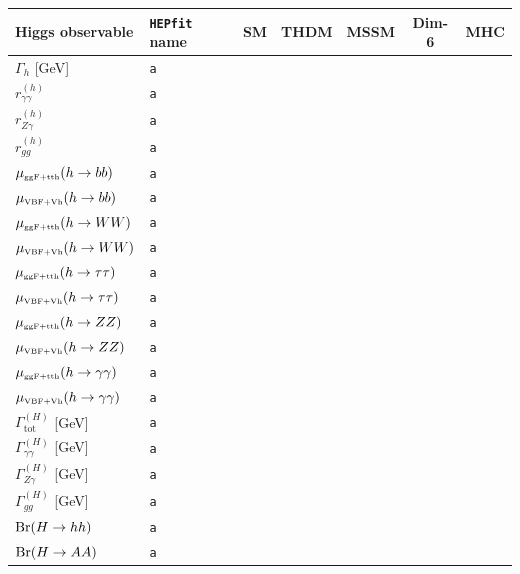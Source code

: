 \documentclass[aps,superscriptaddress,nofootinbib,floatfix,notitlepage]{revtex4-1}
\newcommand{\HEPfit}{\texttt{HEPfit}\xspace}
\begin{document}
\begin{table}
  \centering
  \begin{tabular}{|l|l|c|c|c|c|c|}
    \hline
    \textbf{Higgs observable} & \textbf{\HEPfit name} & \textbf{SM} & \textbf{THDM} & \textbf{MSSM} & \textbf{Dim-6} & \textbf{MHC} \\
    \hline
	$\Gamma_h$ [GeV] & \tt{a} & & \checkmark & & &\\
    \hline
	$r^{(h)}_{\gamma\gamma}$ & \tt{a} & & \checkmark & & &\\
    \hline
	$r^{(h)}_{Z\gamma}$ & \tt{a} & & \checkmark & & &\\
    \hline
	$r^{(h)}_{gg}$ & \tt{a} & & \checkmark & & &\\
    \hline
	$\mu_{\text{\tiny{ggF+tth}}}(h\to bb)$ & \tt{a} & & \checkmark & & &\\
    \hline
	$\mu_{\text{\tiny{VBF+Vh}}}(h\to bb)$ & \tt{a} & & \checkmark & & &\\
    \hline
	$\mu_{\text{\tiny{ggF+tth}}}(h\to WW)$ & \tt{a} & & \checkmark & & &\\
    \hline
	$\mu_{\text{\tiny{VBF+Vh}}}(h\to WW)$ & \tt{a} & & \checkmark & & &\\
    \hline
	$\mu_{\text{\tiny{ggF+tth}}}(h\to \tau \tau)$ & \tt{a} & & \checkmark & & &\\
    \hline
	$\mu_{\text{\tiny{VBF+Vh}}}(h\to \tau \tau)$ & \tt{a} & & \checkmark & & &\\
    \hline
	$\mu_{\text{\tiny{ggF+tth}}}(h\to ZZ)$ & \tt{a} & & \checkmark & & &\\
    \hline
	$\mu_{\text{\tiny{VBF+Vh}}}(h\to ZZ)$ & \tt{a} & & \checkmark & & &\\
    \hline
	$\mu_{\text{\tiny{ggF+tth}}}(h\to \gamma\gamma)$ & \tt{a} & & \checkmark & & &\\
    \hline
	$\mu_{\text{\tiny{VBF+Vh}}}(h\to \gamma\gamma)$ & \tt{a} & & \checkmark & & &\\
    \hline
	$\Gamma^{(H)}_{\text{tot}}$ [GeV] & \tt{a} & & \checkmark & & &\\
    \hline
	$\Gamma^{(H)}_{\gamma\gamma}$ [GeV] & \tt{a} & & \checkmark & & &\\
    \hline
	$\Gamma^{(H)}_{Z\gamma}$ [GeV] & \tt{a} & & \checkmark & & &\\
    \hline
	$\Gamma^{(H)}_{gg}$ [GeV] & \tt{a} & & \checkmark & & &\\
    \hline
	${\rm Br}(H\to hh)$ & \tt{a} & & \checkmark & & &\\
    \hline
	${\rm Br}(H\to AA)$ & \tt{a} & & \checkmark & & &\\

\end{tabular}
\end{table}
\end{document}
